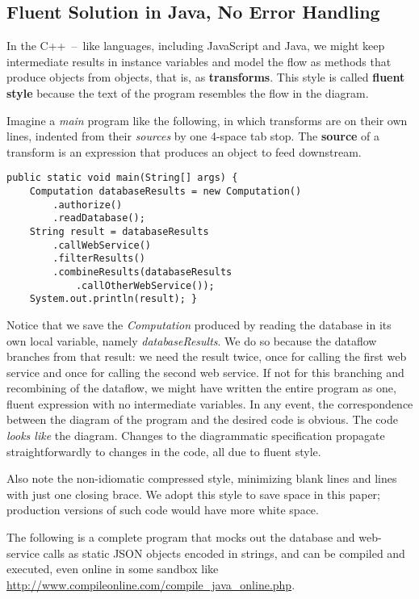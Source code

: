 \documentclass[11pt]{article}
\begin{document}
\subsection{Fluent Solution in Java, No Error Handling}
\label{sec-2-1}

In the \mbox{C++ -- like} languages, including JavaScript and Java,
we might keep intermediate results in instance variables and model
the flow as methods that produce objects from objects, that is,
as \textbf{transforms}. This style is called \textbf{fluent style}
because the text of the program resembles the flow in the diagram.

Imagine a \emph{main} program like the following, in which transforms are
on their own lines, indented from their \emph{sources} by one
\mbox{4-space} tab stop. The \textbf{source} of a transform is an
expression that produces an object to feed downstream.

\begin{verbatim}
public static void main(String[] args) {
    Computation databaseResults = new Computation()
        .authorize()
        .readDatabase();
    String result = databaseResults
        .callWebService()
        .filterResults()
        .combineResults(databaseResults
            .callOtherWebService());
    System.out.println(result); }
\end{verbatim}

Notice that we save the \emph{Computation} produced by reading the
database in its own local variable, namely \emph{databaseResults}. We do
so because the dataflow branches from that result: we need the
result twice, once for calling the first web service and once for
calling the second web service. If not for this branching and
recombining of the dataflow, we might have written the entire
program as one, fluent expression with no intermediate variables.
In any event, the correspondence between the diagram of the program
and the desired code is obvious. The code \emph{looks like} the diagram.
Changes to the diagrammatic specification propagate
straightforwardly to changes in the code, all due to fluent style.

Also note the non-idiomatic compressed style, minimizing blank lines
and lines with just one closing brace. We adopt this style to save
space in this paper; production versions of such code would have
more white space.

The following is a complete program that mocks out the database and
web-service calls as static JSON objects encoded in strings, and can
be compiled and executed, even online in some sandbox like
\url{http://www.compileonline.com/compile_java_online.php}.
\end{document}
